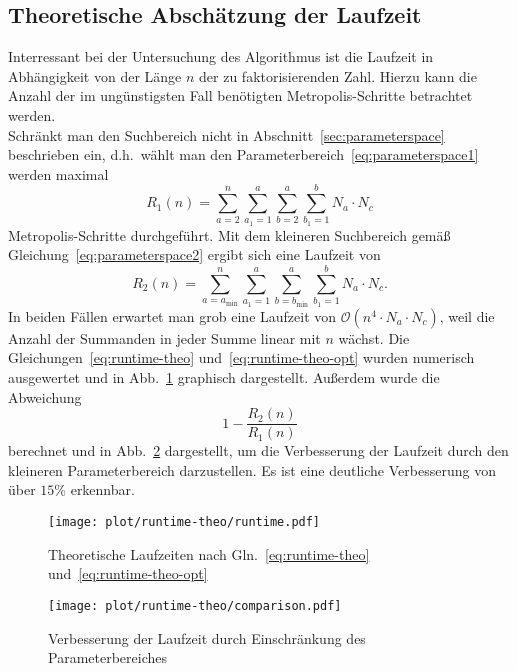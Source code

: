 \subsection{Theoretische Abschätzung der Laufzeit}\label{sec:runtime-theo}
Interressant bei der Untersuchung des Algorithmus ist die Laufzeit in Abhängigkeit von der Länge $n$ der zu faktorisierenden Zahl. Hierzu kann die Anzahl der im ungünstigsten Fall benötigten Metropolis-Schritte betrachtet werden. \\
Schränkt man den Suchbereich nicht in Abschnitt~\ref{sec:parameterspace} beschrieben ein, d.h.\ wählt man den Parameterbereich~\ref{eq:parameterspace1} werden maximal
\begin{equation}
		R_1\left(n\right)=\sum\limits_{a=2}^{n}\sum\limits_{a_1=1}^{a}\sum\limits_{b=2}^{a}\sum\limits_{b_1=1}^{b}N_a\cdot N_c\label{eq:runtime-theo}
\end{equation}
Metropolis-Schritte durchgeführt. Mit dem kleineren Suchbereich gemäß Gleichung~\ref{eq:parameterspace2} ergibt sich eine Laufzeit von
\begin{equation}
		R_2\left(n\right)=\sum\limits_{a=a_\mathrm{min}}^{n}\sum\limits_{a_1=1}^{a}\sum\limits_{b=b_\mathrm{min}}^{a}\sum\limits_{b_1=1}^{b}N_a\cdot N_c\label{eq:runtime-theo-opt}.
\end{equation}
In beiden Fällen erwartet man grob eine Laufzeit von $\mathcal{O}\left(n^4\cdot N_a\cdot N_c\right)$, weil die Anzahl der Summanden in jeder Summe linear mit $n$ wächst. Die Gleichungen~\eqref{eq:runtime-theo} und~\eqref{eq:runtime-theo-opt} wurden numerisch ausgewertet und in Abb.~\ref{fig:runtime-theo} graphisch dargestellt. Außerdem wurde die Abweichung
\begin{equation*}
		1-\frac{R_2\left(n\right)}{R_1\left(n\right)}
\end{equation*}
berechnet und in Abb.~\ref{fig:runtime-theo-comparison} dargestellt, um die Verbesserung der Laufzeit durch den kleineren Parameterbereich darzustellen. Es ist eine deutliche Verbesserung von über $15\%$ erkennbar. 
\begin{figure}[ht]
		\centering
		\texttt{[image: plot/runtime-theo/runtime.pdf]}
		\caption{Theoretische Laufzeiten nach Gln.~\eqref{eq:runtime-theo} und~\eqref{eq:runtime-theo-opt}}\label{fig:runtime-theo}
\end{figure}
\begin{figure}[ht]
		\centering
		\texttt{[image: plot/runtime-theo/comparison.pdf]}
		\caption{Verbesserung der Laufzeit durch Einschränkung des Parameterbereiches}\label{fig:runtime-theo-comparison}
\end{figure}
